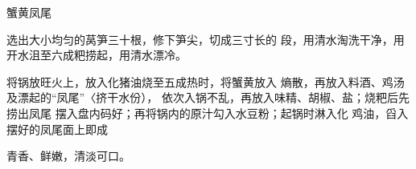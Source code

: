 \begin{recipe}{蟹黄凤尾}

\ingredients


\cooking

\step 	选出大小均匀的莴笋三十根，修下笋尖，切成三寸长的 段，用清水淘洗干净，用开水沮至六成粑捞起，用清水漂冷。

\step 	将锅放旺火上，放入化猪油烧至五成热时，将蟹黄放入 熵散，再放入料酒、鸡汤及漂起的“凤尾”〈挤干水份）， 依次入锅不乱，再放入味精、胡椒、盐；烧粑后先捞出凤尾 摆入盘内码好；再将锅内的原汁勾入水豆粉；起锅时淋入化 鸡油，舀入摆好的凤尾面上即成

\notes

青香、鲜嫩，清淡可口。

\end{recipe}

